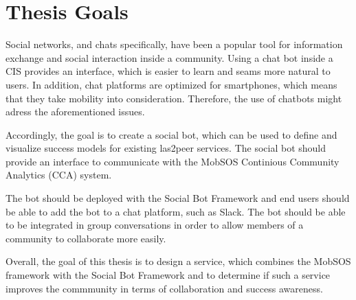 \section{Thesis Goals}

Social networks, and chats specifically, have been a popular tool for information exchange and social interaction inside a community. Using a chat bot inside a CIS provides an interface, which is easier to learn and seams more natural to users. In addition, chat platforms are optimized for smartphones, which means that they take mobility into consideration. Therefore, the use of chatbots might adress the aforementioned issues.

Accordingly, the goal is to create a social bot, which can be used to define and visualize success models for existing las2peer services. The social bot should provide an interface to communicate with the MobSOS Continious Community Analytics (CCA) system.

The bot should be deployed with the Social Bot Framework and end users should be able to add the bot to a chat platform, such as Slack. The bot should be able to be integrated in group conversations in order to allow members of a community to collaborate more easily.

Overall, the goal of this thesis is to design a service, which combines the MobSOS framework with the Social Bot Framework and to determine if such a service improves the commmunity in terms of collaboration and success awareness.


\blankpage
